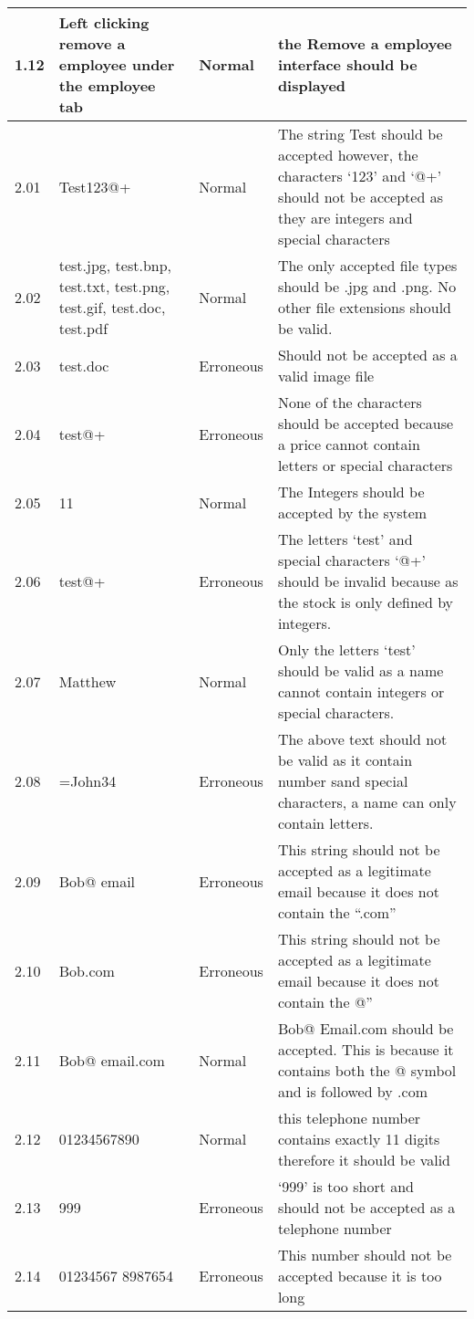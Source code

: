 \begin{flushleft}
\begin{longtable}{|p{1.5cm}|p{2.5cm}|p{2cm}|p{4.5cm}|}
	1.12 & Left clicking remove a employee under the employee tab & Normal & the Remove a employee interface should be displayed  \\ \hline
	2.01 & Test123@+ & Normal & The string Test should be accepted however, the characters `123' and `@+' should not be accepted as they are integers and special characters  \\ \hline
	2.02 &  test.jpg, test.bnp, test.txt, test.png, test.gif, test.doc, test.pdf & Normal & The only accepted file types should be .jpg and .png. No other file extensions should be valid.  \\ \hline
	2.03 &  test.doc & Erroneous &  Should not be accepted as a valid image file  \\ \hline
	2.04 &  test@+ & Erroneous  &  None of the characters should be accepted because a price cannot contain letters or special characters  \\ \hline
	2.05 &  11  & Normal & The Integers should be accepted by the system \\ \hline
	2.06 &  test@+ & Erroneous & The letters `test' and special characters `@+' should be invalid because as the stock is only defined by integers. \\ \hline
	2.07 &  Matthew & Normal & Only the letters `test' should be valid as a name cannot contain integers or special characters. \\ \hline
	2.08 &  =John34 & Erroneous & The above text should not be valid as it contain number sand special characters, a name can only contain letters. \\ \hline
	2.09 &   Bob@ email  & Erroneous & This string should not be accepted as a legitimate email because it does not contain the ``.com'' \\ \hline
	2.10 &  Bob.com& Erroneous &  This string should not be accepted as a legitimate email because it does not contain the @'' \\ \hline
	2.11 &  Bob@ email.com & Normal &  Bob@ Email.com should be accepted. This is because it contains both the @ symbol and is followed by .com \\ \hline
	2.12 &  01234567890 & Normal & this telephone number contains exactly 11 digits therefore it should be valid \\ \hline
	2.13 &  999& Erroneous &  `999' is too short and should not be accepted as a telephone number \\ \hline
	2.14 &  01234567 8987654 & Erroneous & This number should not be accepted because it is too long \\ \hline

\end{longtable}
\end{flushleft}
